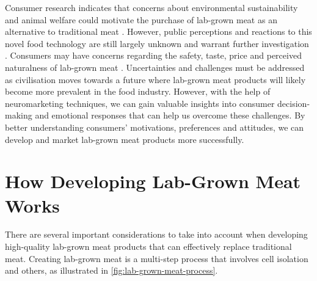 \documentclass[10pt]{article}
\begin{document}
\begin{sloppypar}
  Consumer research indicates that concerns about environmental sustainability and animal welfare could motivate the purchase of lab-grown meat as an alternative to traditional meat \citep{circus_exploring_2018}. However, public perceptions and reactions to this novel food technology are still largely unknown and warrant further investigation \citep{verbeke_would_2015}. Consumers may have concerns regarding the safety, taste, price and perceived naturalness of lab-grown meat \citep{bryant_consumer_2018}. Uncertainties and challenges must be addressed as civilisation moves towards a future where lab-grown meat products will likely become more prevalent in the food industry. However, with the help of neuromarketing techniques, we can gain valuable insights into consumer decision-making and emotional responses that can help us overcome these challenges. By better understanding consumers’ motivations, preferences and attitudes, we can develop and market lab-grown meat products more successfully.

  \section{How Developing Lab-Grown Meat Works}
  \label{sec:developing-lab-grown-meat}

  There are several important considerations to take into account when developing high-quality lab-grown meat products that can effectively replace traditional meat. Creating lab-grown meat is a multi-step process that involves cell isolation and others, as illustrated in \autoref{fig:lab-grown-meat-process}.


\end{sloppypar}
\end{document}

